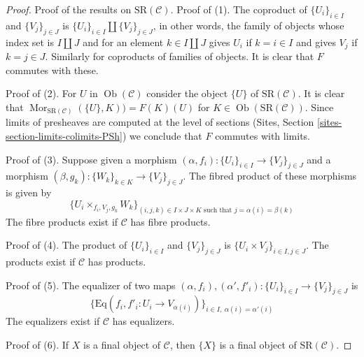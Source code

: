 \documentclass{stacks-project}
\theoremstyle{plain}
\theoremstyle{definition}
\theoremstyle{remark}
\numberwithin{equation}{subsection}
\def\Mor{\mathop{\mathrm{Mor}}\nolimits}
\def\Ob{\mathop{\mathrm{Ob}}\nolimits}
\begin{document}
\begin{proof}
Proof of the results on $\text{SR}(\mathcal{C})$.
Proof of (1). The coproduct of $\{U_i\}_{i \in I}$ and $\{V_j\}_{j \in J}$ is
$\{U_i\}_{i \in I} \amalg \{V_j\}_{j \in J}$, in other words, the family
of objects whose index set is $I \amalg J$ and for an element
$k \in I \amalg J$ gives $U_i$ if $k = i \in I$ and gives $V_j$ if
$k = j \in J$. Similarly for coproducts
of families of objects. It is clear that $F$ commutes with these.

\medskip\noindent
Proof of (2). For $U$ in $\Ob(\mathcal{C})$ consider the object $\{U\}$ of
$\text{SR}(\mathcal{C})$. It is clear that
$\Mor_{\text{SR}(\mathcal{C})}(\{U\}, K)) = F(K)(U)$
for $K \in \Ob(\text{SR}(\mathcal{C}))$. Since limits of presheaves
are computed at the level of sections
(Sites, Section \ref{sites-section-limits-colimits-PSh})
we conclude that $F$ commutes with limits.

\medskip\noindent
Proof of (3). Suppose given a morphism
$(\alpha, f_i) : \{U_i\}_{i \in I} \to \{V_j\}_{j \in J}$
and a morphism
$(\beta, g_k) : \{W_k\}_{k \in K} \to \{V_j\}_{j \in J}$.
The fibred product of these morphisms is given by
$$
\{ U_i \times_{f_i, V_j, g_k} W_k\}_{(i, j, k) \in I \times J \times K
\text{ such that } j = \alpha(i) = \beta(k)}
$$
The fibre products exist if $\mathcal{C}$ has fibre products.

\medskip\noindent
Proof of (4). The product of $\{U_i\}_{i \in I}$ and $\{V_j\}_{j \in J}$ is
$\{U_i \times V_j\}_{i \in I, j \in J}$. The products exist if
$\mathcal{C}$ has products.

\medskip\noindent
Proof of (5). The equalizer of two maps
$(\alpha, f_i), (\alpha', f'_i) : \{U_i\}_{i \in I} \to \{V_j\}_{j \in J}$
is
$$
\{
\text{Eq}(f_i, f'_i : U_i \to V_{\alpha(i)})
\}_{i \in I,\ \alpha(i) = \alpha'(i)}
$$
The equalizers exist if $\mathcal{C}$ has equalizers.

\medskip\noindent
Proof of (6). If $X$ is a final object of $\mathcal{C}$, then
$\{X\}$ is a final object of $\text{SR}(\mathcal{C})$.


\end{proof}
\end{document}
